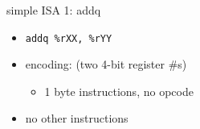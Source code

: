 \begin{frame}[fragile,label=AddIntro]{simple ISA 1: addq}
    \instrEncodingStyles
    \begin{itemize}
        \item \lstinline|addq %rXX, %rYY|
        \item encoding:     (two 4-bit register \#s)
            \begin{itemize}
            \item 1 byte instructions, no opcode
            \end{itemize}
        \vspace{.5cm}
        \item no other instructions
    \end{itemize}
\end{frame}


